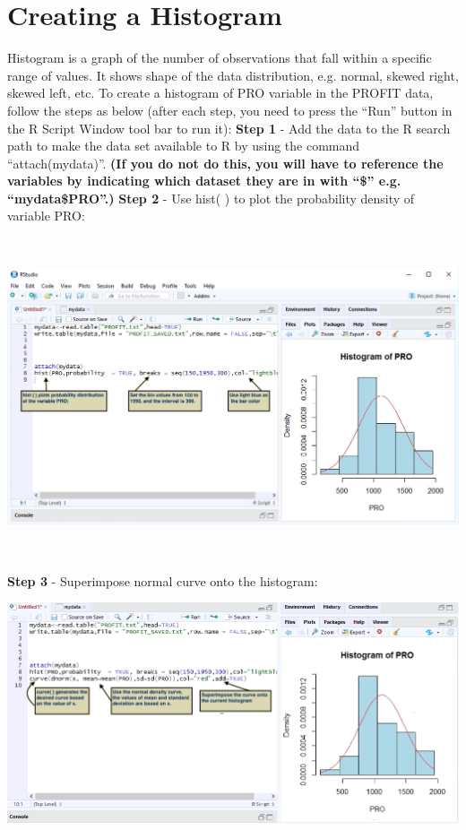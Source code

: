 \documentclass[a4paper]{report}
\begin{document}
    \section{Creating a Histogram}
        \begin{flushleft}
        Histogram is a graph of the number of observations that fall within a specific range of values. It shows shape of the data distribution, e.g. normal, skewed right, skewed left, etc. To create a histogram of PRO variable in the PROFIT data, follow the steps as below (after each step, you need to press the ``Run'' button in the R Script Window tool bar to run it):
        \newline\newline
        \textbf{Step 1} - Add the data to the R search path to make the data set available to R by using the command ``attach(mydata)''. \textbf{(If you do not do this, you will have to reference the variables by indicating which dataset they are in with ``\$'' e.g. ``mydata\$PRO''.)}
        \newline\newline
        \textbf{Step 2} - Use hist( ) to plot the probability density of variable PRO:
        
        \includegraphics[width=5.5in,height=3.7in]{images/HIST1.png}
        
        \newpage
     \newpage  \textbf{Step 3} - Superimpose normal curve onto the histogram:
     
        \includegraphics[width=\textwidth]{images/HIST2.png}
        \end{flushleft}
        
\end{document}

